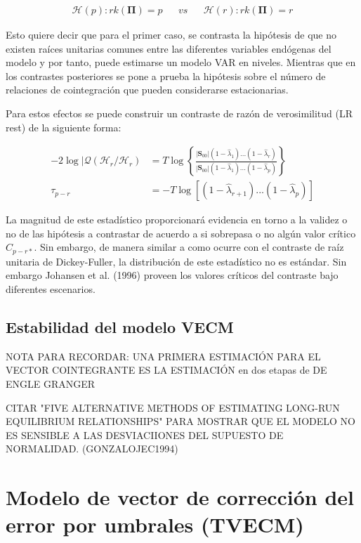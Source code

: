 \documentclass[12pt, twoside]{book}\usepackage[]{graphicx}\usepackage[]{color}
\numberwithin{equation}{section}
\numberwithin{theorem}{section}
\numberwithin{teorema}{section}
\numberwithin{defi}{section}
\numberwithin{prop}{section}
\numberwithin{defi}{section}
\theoremstyle{plain}
\begin{document}
\begin{align}
\mathcal{H}(p): rk(\boldsymbol{\Pi})=p && vs && \mathcal{H}(r): rk(\boldsymbol{\Pi})=r 
\end{align}

Esto quiere decir que para el primer caso, se contrasta la hipótesis de que no existen raíces unitarias comunes entre las diferentes variables endógenas del modelo y por tanto, puede estimarse un modelo VAR en niveles. Mientras que en los contrastes posteriores se pone a prueba la hipótesis sobre el número de relaciones de cointegración que pueden considerarse estacionarias. 

Para estos efectos se puede construir un contraste de razón de verosimilitud (LR rest) de la siguiente forma: 

\begin{align}
-2 \log |\mathcal{Q}(\mathcal{H}_{r}/\mathcal{H}_{r}) & = T\log \left\{\frac{|\mathbf{S}_{00}|(1-\hat{\lambda}_{1})...(1-\hat{\lambda}_{r})}{|\mathbf{S}_{00}|(1-\hat{\lambda}_{1})...(1-\hat{\lambda}_{p})}\right\} \\ 
\tau_{p-r} & = -T\log\left[(1-\hat{\lambda}_{r+1})...(1-\hat{\lambda}_{p})\right]
\end{align}

La magnitud de este estadístico proporcionará evidencia en torno a la validez o no de las hipótesis a contrastar de acuerdo a si sobrepasa o no algún valor crítico $C_{p-r*}$. Sin embargo, de manera similar a como ocurre con el contraste de raíz unitaria de Dickey-Fuller, la distribución de este estadístico no es estándar. Sin embargo Johansen et al. (1996) proveen los valores críticos del contraste bajo diferentes escenarios. 


\subsection{Estabilidad del modelo VECM}

NOTA PARA RECORDAR: UNA PRIMERA ESTIMACIÓN PARA EL VECTOR COINTEGRANTE ES LA ESTIMACIÓN en dos etapas de DE ENGLE GRANGER


CITAR "FIVE ALTERNATIVE METHODS OF ESTIMATING LONG-RUN EQUILIBRIUM RELATIONSHIPS" PARA MOSTRAR QUE EL MODELO NO ES SENSIBLE A LAS DESVIACIIONES DEL SUPUESTO DE NORMALIDAD. (GONZALOJEC1994)

\section{Modelo de vector de corrección del error por umbrales (TVECM)}
\end{document}
